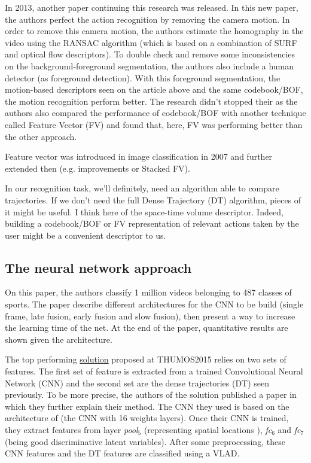 \documentclass[a4paper]{article}
\begin{document}
			In 2013, another paper continuing this research was released\cite{wang2013action}. In this new paper, the authors perfect the action recognition by removing the camera motion. In order to remove this camera motion, the authors estimate the homography in the video using the RANSAC algorithm (which is based on a combination of SURF and optical flow descriptors). To double check and remove some inconsistencies on the background-foreground segmentation, the authors also include a human detector (as foreground detection). With this foreground segmentation, the motion-based descriptors seen on the article above and the same codebook/BOF, the motion recognition perform better. The research didn't stopped their as the authors also compared the performance of codebook/BOF with another technique called Feature Vector (FV) and found that, here, FV was performing better than the other approach. 

			Feature vector was introduced in image classification in 2007\cite{perronnin2007fisher} and further extended then (e.g. improvements\cite{perronnin2010improving} or Stacked FV\cite{peng2014action}). 

			\begin{mdframed}[backgroundcolor = gray!30]
				In our recognition task, we'll definitely, need an algorithm able to compare trajectories. If we don't need the full Dense Trajectory (DT) algorithm, pieces of it might be useful. I think here of the space-time volume descriptor. Indeed, building a codebook/BOF or FV representation of relevant actions taken by the user might be a convenient descriptor to us.
			\end{mdframed}



		\subsection{The neural network approach}
		\label{sub:neural}
			On this paper\cite{karpathy2014large}, the authors classify 1 million videos belonging to 487 classes of sports. The paper describe different architectures for the CNN to be build (single frame, late fusion, early fusion and slow fusion), then present a way to increase the learning time of the net. At the end of the paper, quantitative results are shown given the architecture.

			The top performing \href{http://storage.googleapis.com/www.thumos.info/thumos15_notebooks/TH15_UTS&CMU.pdf}{solution} proposed at THUMOS2015\cite{THUMOS15} relies on two sets of features. The first set of feature is extracted from a trained Convolutional Neural Network (CNN) and the second set are the dense trajectories (DT) seen previously. To be more precise, the authors of the solution published a paper\cite{xu2014discriminative} in which they further explain their method. The CNN they used is based on the architecture of \cite{simonyan2014very} (the CNN with 16 weights layers). Once their CNN is trained, they extract features from layer \textit{pool$_5$} (representing spatial locations ), \textit{fc$_6$} and \textit{fc$_7$} (being good discriminative latent variables). After some preprocessing, these CNN features and the DT features are classified using a VLAD.
\end{document}
